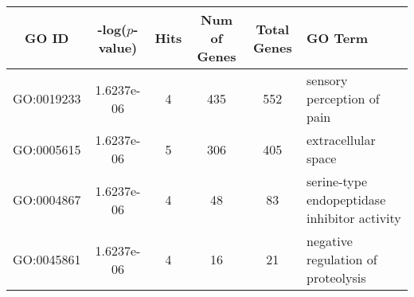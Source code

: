 \centering \begin{tabular}{c|c|c|c|c|p{2in}}
GO ID	&-log($p$-value)	&Hits	&Num of Genes	&Total Genes	&GO Term\\\hline
GO:0019233	&1.6237e-06	&4	&435	&552	&sensory perception of pain\\
GO:0005615	&1.6237e-06	&5	&306	&405	&extracellular space\\
GO:0004867	&1.6237e-06	&4	&48	&83	&serine-type endopeptidase inhibitor activity\\
GO:0045861	&1.6237e-06	&4	&16	&21	&negative regulation of proteolysis\\
\end{tabular}
